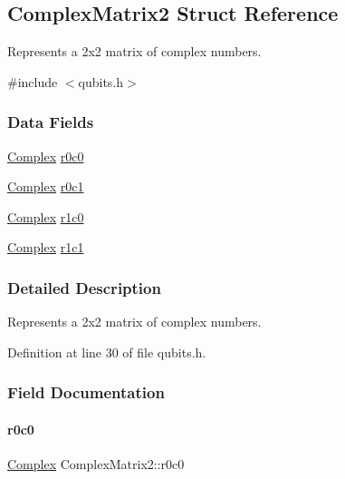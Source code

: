 \hypertarget{structComplexMatrix2}{}\subsection{Complex\+Matrix2 Struct Reference}
\label{structComplexMatrix2}


Represents a 2x2 matrix of complex numbers.  




{\ttfamily \#include $<$qubits.\+h$>$}

\subsubsection*{Data Fields}
\begin{DoxyCompactItemize}
\item 
\mbox{\hyperlink{structComplex}{Complex}} \mbox{\hyperlink{structComplexMatrix2_ae72b4458233b077a636beee1892e81ff}{r0c0}}
\item 
\mbox{\hyperlink{structComplex}{Complex}} \mbox{\hyperlink{structComplexMatrix2_a0f3932f055a8b05cef361bce25d51172}{r0c1}}
\item 
\mbox{\hyperlink{structComplex}{Complex}} \mbox{\hyperlink{structComplexMatrix2_ab98282015ed2065e53fbc9638e2583ab}{r1c0}}
\item 
\mbox{\hyperlink{structComplex}{Complex}} \mbox{\hyperlink{structComplexMatrix2_a763007c3070802373549ba0350f83c8a}{r1c1}}
\end{DoxyCompactItemize}


\subsubsection{Detailed Description}
Represents a 2x2 matrix of complex numbers. 

Definition at line 30 of file qubits.\+h.



\subsubsection{Field Documentation}
\mbox{\label{structComplexMatrix2_ae72b4458233b077a636beee1892e81ff}} 
\paragraph{\texorpdfstring{r0c0}{r0c0}}
{\footnotesize\ttfamily \mbox{\hyperlink{structComplex}{Complex}} Complex\+Matrix2\+::r0c0}



